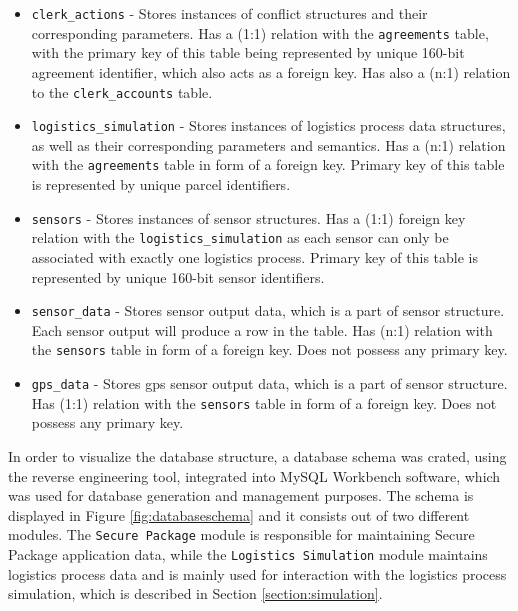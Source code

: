 \begin{itemize}
\item \texttt{clerk\_actions} - Stores instances of conflict structures and their corresponding parameters. Has a (1:1) relation with the \texttt{agreements} table, with the primary key of this table being represented by unique 160-bit agreement identifier, which also acts as a foreign key. Has also a (n:1) relation to the \texttt{clerk\_accounts} table.

\item \texttt{logistics\_simulation} - Stores instances of logistics process data structures, as well as their corresponding parameters and semantics. Has a (n:1) relation with the \texttt{agreements} table in form of a foreign key. Primary key of this table is represented by unique parcel identifiers.

\item \texttt{sensors} - Stores instances of sensor structures. Has a (1:1) foreign key relation with the \texttt{logistics\_simulation} as each sensor can only be associated with exactly one logistics process. Primary key of this table is represented by unique 160-bit sensor identifiers. 

\item \texttt{sensor\_data} - Stores sensor output data, which is a part of sensor structure. Each sensor output will produce a row in the table. Has (n:1) relation with the \texttt{sensors} table in form of a foreign key. Does not possess any primary key.

\item \texttt{gps\_data} - Stores gps sensor output data, which is a part of sensor structure. Has (1:1) relation with the \texttt{sensors} table in form of a foreign key. Does not possess any primary key.
\end{itemize}

In order to visualize the database structure, a database schema was crated, using the reverse engineering tool, integrated into MySQL Workbench software, which was used for database generation and management purposes. The schema is displayed in Figure \ref{fig:databaseschema} and it consists out of two different modules. The \texttt{Secure Package} module is responsible for maintaining Secure Package application data, while the \texttt{Logistics Simulation} module maintains logistics process data and is mainly used for interaction with the logistics process simulation, which is described in Section \ref{section:simulation}.

